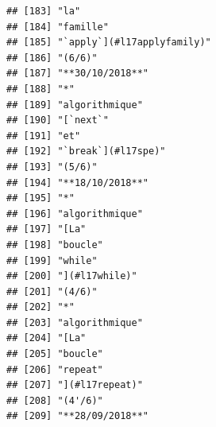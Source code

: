 \documentclass[]{book}
\begin{document}
\begin{verbatim}
## [183] "la"                                                                                     
## [184] "famille"                                                                                
## [185] "`apply`](#l17applyfamily)"                                                              
## [186] "(6/6)"                                                                                  
## [187] "**30/10/2018**"                                                                         
## [188] "*"                                                                                      
## [189] "algorithmique"                                                                          
## [190] "[`next`"                                                                                
## [191] "et"                                                                                     
## [192] "`break`](#l17spe)"                                                                      
## [193] "(5/6)"                                                                                  
## [194] "**18/10/2018**"                                                                         
## [195] "*"                                                                                      
## [196] "algorithmique"                                                                          
## [197] "[La"                                                                                    
## [198] "boucle"                                                                                 
## [199] "while"                                                                                  
## [200] "](#l17while)"                                                                           
## [201] "(4/6)"                                                                                  
## [202] "*"                                                                                      
## [203] "algorithmique"                                                                          
## [204] "[La"                                                                                    
## [205] "boucle"                                                                                 
## [206] "repeat"                                                                                 
## [207] "](#l17repeat)"                                                                          
## [208] "(4'/6)"                                                                                 
## [209] "**28/09/2018**"                                                                         

\end{verbatim}
\end{document}
